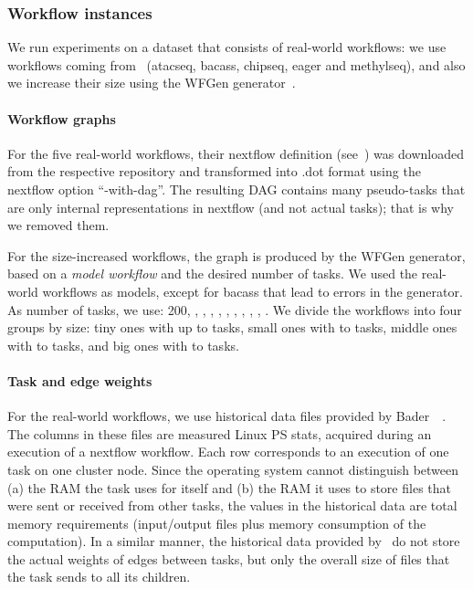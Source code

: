 \documentclass[conference]{IEEEtran}
\newcommand{\skug}[1]{{\color{blue}[SK: #1]}}
\begin{document}
    \subsubsection{Workflow instances}
    We run  experiments on a dataset that consists of real-world workflows: 
    we use workflows coming from~\cite{lotaru} (atacseq, bacass, chipseq,
    eager and methylseq), and also we increase their size using the WFGen generator~\cite{COLEMAN202216}.


    \paragraph{Workflow graphs}
    For the five real-world workflows, their nextflow definition (see~\cite{ewels2020nf}) was downloaded from the
    respective repository and transformed into .dot format using the nextflow option ``-with-dag''.
    The resulting DAG contains many pseudo-tasks that are only internal representations in nextflow
    (and not actual tasks); that is why we removed them.

    For the size-increased workflows, the graph is produced by the WFGen generator, based on a {\em model workflow} and
    the desired number of tasks.
    We used the real-world workflows as models, except for bacass that lead to errors in the generator.
%
    As number of tasks, we use: 200, , , , , ,
    , , , , .
    We divide the workflows into four groups by size: tiny ones with up to  tasks, small ones with  to  tasks,
    middle ones with  to  tasks, and big ones with  to  tasks.

    \paragraph{Task and edge weights}
    For the real-world workflows, we use historical data files provided by Bader~\etal~\cite{lotaru}.
    The columns in these files are measured Linux PS stats, acquired during an execution of a nextflow workflow.
    Each row corresponds to an execution of one task on one cluster node.
    Since the operating system cannot distinguish between (a) the RAM the task uses for itself and (b) the RAM it uses
    to store files that were sent or received from other tasks, the values in the historical data are total memory requirements (input/output files plus memory consumption of the computation).
    In a similar manner, the historical data provided by~\cite{lotaru} do not store the actual weights of edges between tasks, but only the overall
    size of files that the task sends to all its children.
\end{document}
